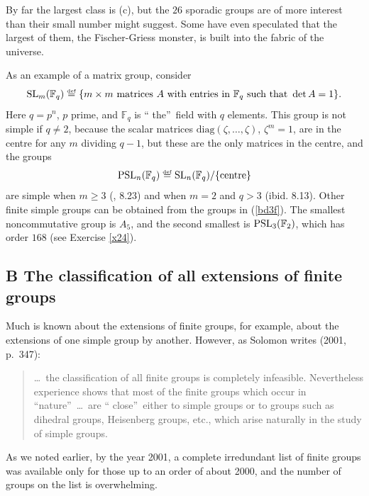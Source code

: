 \documentclass[a4paper,11pt,final]{memoir}%
\theoremstyle{nonumberplain}
\begin{document}
By far the largest class is (c), but the $26$ sporadic groups are of more
interest than their small number might suggest. Some have even speculated that
the largest of them, the Fischer-Griess monster, is built into the fabric of
the universe.

As an example of a matrix group, consider
\[
\SL_{m}(\mathbb{F}_{q})\overset{\df}{=}\{m\times m\text{
matrices $A$ with entries in }\mathbb{F}_{q}\text{ such that }\det A=1\}.
\]
Here $q=p^{n}$, $p$ prime, and $\mathbb{F}_{q}$ is \textquotedblleft
the\textquotedblright\ field with $q$ elements. This group is not simple if
$q\neq2$, because the scalar matrices $\text{diag}(\zeta,\ldots,\zeta)$,
$\zeta^{m}=1$, are in the centre for any $m$ dividing $q-1$, but these are the
only matrices in the centre, and the groups%
\[
\text{PSL}_{n}(\mathbb{F}_{q})\overset{\df}{=}\SL_{n}%
(\mathbb{F}_{q})/\{\text{centre}\}
\]
are simple when $m\geq3$ (\cite{rotman1995}, 8.23) and when $m=2$ and $q>3$
(ibid. 8.13). Other finite simple groups can be obtained from the groups in
(\ref{bd3f}). The smallest noncommutative group is $A_{5}$, and the second
smallest is $\operatorname{PSL}_{3}(\mathbb{F}{}_{2})$, which has order $168$ (see Exercise
\ref{x24}).

\subsection{B The classification of all extensions of finite groups}

Much is known about the extensions of finite groups, for example, about the
extensions of one simple group by another. However, as Solomon writes (2001, p.~347):

\begin{quote}
\ldots\ the classification of all finite groups is completely infeasible.
Nevertheless experience shows that most of the finite groups which occur in
\textquotedblleft nature\textquotedblright\ \ldots\ are \textquotedblleft
close\textquotedblright\ either to simple groups or to groups such as dihedral
groups, Heisenberg groups, etc., which arise naturally in the study of simple groups.
\end{quote}

\noindent As we noted earlier, by the year 2001, a complete irredundant list
of finite groups was available only for those up to an order of about 2000,
and the number of groups on the list is overwhelming.
\end{document}
